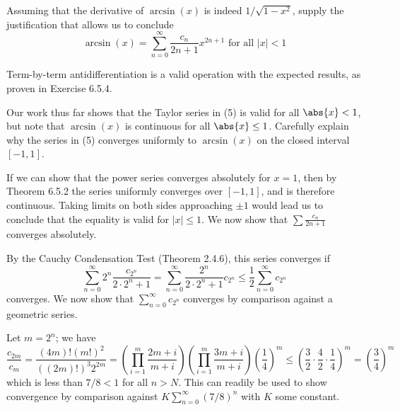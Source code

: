 \begin{exercise}
Assuming that the derivative of \(\arcsin(x)\) is indeed \(1 / \sqrt{1-x^2}\), supply the justification that allows us to conclude
\[\arcsin(x) = \sum^\infty_{n=0} \frac{c_n}{2n+1} x^{2n+1} \text{ for all } |x| < 1\]
\end{exercise}
\begin{solution}
Term-by-term antidifferentiation is a valid operation with the expected results, as proven in Exercise 6.5.4.
\end{solution}

\begin{exercise}
   Our work thus far shows that the Taylor series in (5) is valid for all \(\abs{x} < 1\), but note that \(\arcsin(x)\) is continuous for all  \(\abs{x} \leq 1\). Carefully explain why the series in (5) converges uniformly to \(\arcsin (x)\) on the closed interval \([-1,1]\).
\end{exercise}
\begin{solution}
If we can show that the power series converges absolutely for \(x = 1\), then by Theorem 6.5.2 the series uniformly converges over \([-1, 1]\), and is therefore continuous. Taking limits on both sides approaching \(\pm 1\) would lead us to conclude that the equality is valid for \(|x| \leq 1\). We now show that \(\sum \frac{c_n}{2n+1}\) converges absolutely.

By the Cauchy Condensation Test (Theorem 2.4.6), this series converges if
\[\sum^\infty_{n=0} 2^n \frac{c_{2^n}}{2 \cdot 2^n+1} = \sum^\infty_{n=0}\frac{2^n}{2 \cdot 2^n + 1} c_{2^n} \leq \frac{1}{2} \sum^\infty_{n=0} c_{2^n} \]
converges. We now show that \(\sum^\infty_{n=0} c_{2^n}\) converges by comparison against a geometric series.

Let \(m = 2^n\); we have
\[\frac{c_{2m}}{c_m}= \frac{(4m)! (m!)^2}{\left((2m)!\right)^3 2^{2m}} = \left(\prod^{m}_{i=1} \frac{2m+i}{m+i} \right) \left( \prod^{m}_{i=1} \frac{3m+i}{m+i} \right) \left(\frac{1}{4}\right)^m \leq \left(\frac{3}{2} \cdot \frac{4}{2} \cdot \frac{1}{4}\right)^m = \left(\frac{3}{4} \right)^m\]
which is less than \(7/8 < 1\) for all \(n > N\). This can readily be used to show convergence by comparison against \(K\sum^\infty_{n=0} (7/8)^n\) with \(K\) some constant.
\end{solution}

